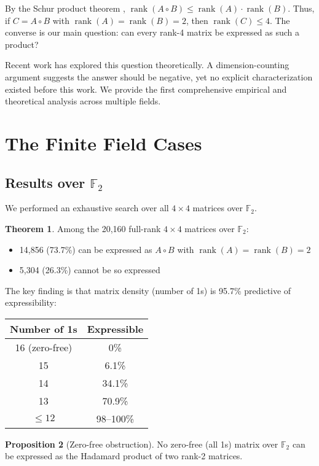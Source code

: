 \documentclass{article}
\theoremstyle{definition}
\newtheorem{theorem}{Theorem}
\newtheorem{proposition}[theorem]{Proposition}
\DeclareMathOperator{\rank}{rank}
\begin{document}
By the Schur product theorem \cite{schur1911}, $\rank(A \circ B) \leq \rank(A) \cdot \rank(B)$. Thus, if $C = A \circ B$ with $\rank(A) = \rank(B) = 2$, then $\rank(C) \leq 4$. The converse is our main question: can every rank-4 matrix be expressed as such a product?

Recent work has explored this question theoretically. A dimension-counting argument \cite{mathoverflow2024} suggests the answer should be negative, yet no explicit characterization existed before this work. We provide the first comprehensive empirical and theoretical analysis across multiple fields.

\section{The Finite Field Cases}

\subsection{Results over $\mathbb{F}_2$}

We performed an exhaustive search over all $4 \times 4$ matrices over $\mathbb{F}_2$.

\begin{theorem}
Among the 20,160 full-rank $4 \times 4$ matrices over $\mathbb{F}_2$:
\begin{itemize}
\item 14,856 (73.7\%) can be expressed as $A \circ B$ with $\rank(A) = \rank(B) = 2$
\item 5,304 (26.3\%) cannot be so expressed
\end{itemize}
\end{theorem}

The key finding is that matrix density (number of 1s) is 95.7\% predictive of expressibility:

\begin{center}
\begin{tabular}{cc}
\toprule
Number of 1s & Expressible \\
\midrule
16 (zero-free) & 0\% \\
15 & 6.1\% \\
14 & 34.1\% \\
13 & 70.9\% \\
$\leq 12$ & 98--100\% \\
\bottomrule
\end{tabular}
\end{center}

\begin{proposition}[Zero-free obstruction]
No zero-free (all 1s) matrix over $\mathbb{F}_2$ can be expressed as the Hadamard product of two rank-2 matrices.
\end{proposition}
\end{document}
